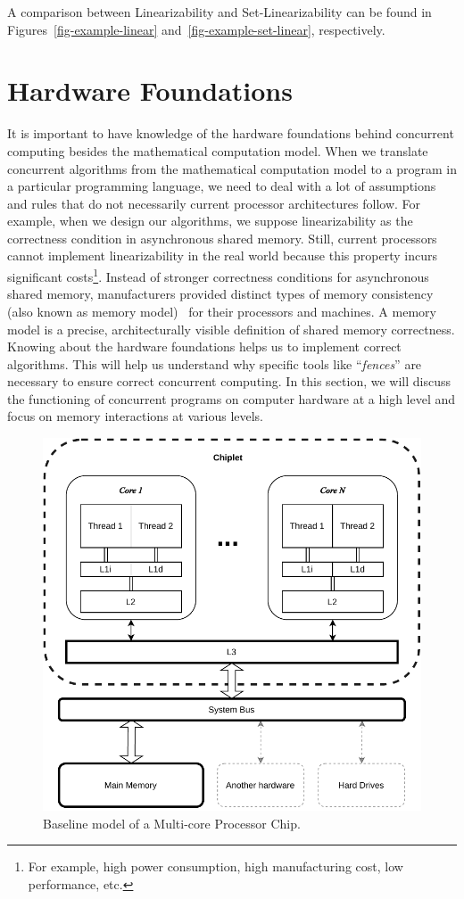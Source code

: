 A comparison between Linearizability and Set-Linearizability can be found in Figures~\ref{fig-example-linear} and~\ref{fig-example-set-linear}, respectively.

\section{\label{sec:hardware-foundations}Hardware Foundations}

It is important to have knowledge of the hardware foundations behind concurrent computing besides the mathematical computation model. When we translate concurrent algorithms from the mathematical computation model to a program in a particular programming language, we need to deal with a lot of assumptions and rules that do not necessarily current processor architectures follow. For example, when we design our algorithms, we suppose linearizability as the correctness condition in asynchronous shared memory. Still, current processors cannot implement linearizability in the real world because this property incurs significant costs\footnote{For example, high power consumption, high manufacturing cost, low performance, etc.}. Instead of stronger correctness conditions for asynchronous shared memory, manufacturers provided distinct types of memory consistency (also known as memory model)~\cite{DBLP_series_synthesis_2020Nagarajan, DBLP_series_synthesis_2013Scott} for their processors and machines. A memory model is a precise, architecturally visible definition of shared memory correctness. Knowing about the hardware foundations helps us to implement correct algorithms. This will help us understand why specific tools like ``\emph{fences}'' are necessary to ensure correct concurrent computing. In this section, we will discuss the functioning of concurrent programs on computer hardware at a high level and focus on memory interactions at various levels.

\begin{figure}[ht!]
    \centering
    \includegraphics[width=0.7\linewidth]{contents//figures/III_2_cpu.pdf}
    \caption{Baseline model of a Multi-core Processor Chip.}
    \label{fig:multi-core-processor}
\end{figure}

